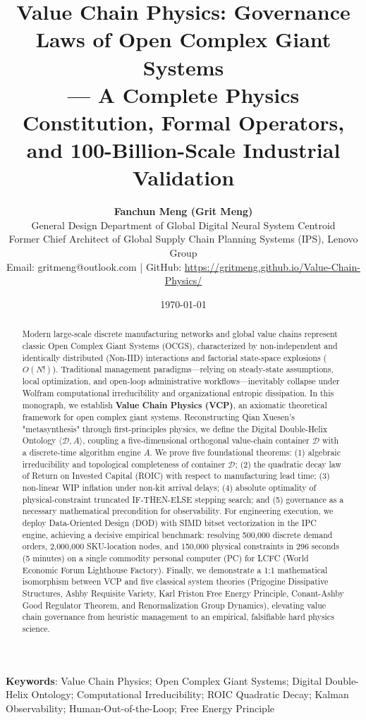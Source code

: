 \documentclass[11pt,a4paper]{article}
\title{\textbf{\Large Value Chain Physics: Governance Laws of Open Complex Giant Systems}\\[0.5em]
\large --- A Complete Physics Constitution, Formal Operators, and 100-Billion-Scale Industrial Validation}
\author{\textbf{Fanchun Meng (Grit Meng)}\\
\small General Design Department of Global Digital Neural System Centroid\\
\small Former Chief Architect of Global Supply Chain Planning Systems (IPS), Lenovo Group\\
\small Email: gritmeng@outlook.com | GitHub: \url{https://gritmeng.github.io/Value-Chain-Physics/}}
\date{\today}
\begin{document}
\maketitle

\begin{abstract}
Modern large-scale discrete manufacturing networks and global value chains represent classic Open Complex Giant Systems (OCGS), characterized by non-independent and identically distributed (Non-IID) interactions and factorial state-space explosions ($O(N!)$). Traditional management paradigms—relying on steady-state assumptions, local optimization, and open-loop administrative workflows—inevitably collapse under Wolfram computational irreducibility and organizational entropic dissipation. In this monograph, we establish \textbf{Value Chain Physics (VCP)}, an axiomatic theoretical framework for open complex giant systems. Reconstructing Qian Xuesen's "metasynthesis" through first-principles physics, we define the Digital Double-Helix Ontology $\langle \mathcal{D}, A \rangle$, coupling a five-dimensional orthogonal value-chain container $\mathcal{D}$ with a discrete-time algorithm engine $A$. We prove five foundational theorems: (1) algebraic irreducibility and topological completeness of container $\mathcal{D}$; (2) the quadratic decay law of Return on Invested Capital (ROIC) with respect to manufacturing lead time; (3) non-linear WIP inflation under non-kit arrival delays; (4) absolute optimality of physical-constraint truncated IF-THEN-ELSE stepping search; and (5) governance as a necessary mathematical precondition for observability. For engineering execution, we deploy Data-Oriented Design (DOD) with SIMD bitset vectorization in the IPC engine, achieving a decisive empirical benchmark: resolving 500,000 discrete demand orders, 2,000,000 SKU-location nodes, and 150,000 physical constraints in 296 seconds (5 minutes) on a single commodity personal computer (PC) for LCFC (World Economic Forum Lighthouse Factory). Finally, we demonstrate a 1:1 mathematical isomorphism between VCP and five classical system theories (Prigogine Dissipative Structures, Ashby Requisite Variety, Karl Friston Free Energy Principle, Conant-Ashby Good Regulator Theorem, and Renormalization Group Dynamics), elevating value chain governance from heuristic management to an empirical, falsifiable hard physics science.
\end{abstract}

\textbf{Keywords}: Value Chain Physics; Open Complex Giant Systems; Digital Double-Helix Ontology; Computational Irreducibility; ROIC Quadratic Decay; Kalman Observability; Human-Out-of-the-Loop; Free Energy Principle
\end{document}
